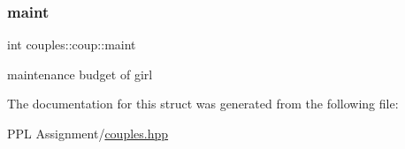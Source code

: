 \subsubsection{\texorpdfstring{maint}{maint}}
{\footnotesize\ttfamily int couples\+::coup\+::maint}

maintenance budget of girl 

The documentation for this struct was generated from the following file\+:\begin{DoxyCompactItemize}
\item 
P\+P\+L Assignment/\hyperlink{couples_8hpp}{couples.\+hpp}\end{DoxyCompactItemize}

